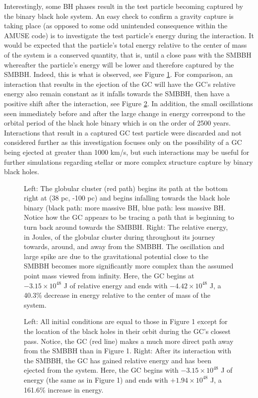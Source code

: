 \documentclass{aastex62}
\begin{document}
Interestingly, some BH phases result in the test particle becoming captured by the binary black hole system. An easy check to confirm a gravity capture is taking place (as opposed to some odd unintended consequence within the AMUSE code) is to investigate the test particle's energy during the interaction. It would be expected that the particle's total energy relative to the center of mass of the system is a conserved quantity, that is, until a close pass with the SMBBH whereafter the particle's energy will be lower and therefore captured by the SMBBH. Indeed, this is what is observed, see Figure \ref{fig3}. For comparison, an interaction that results in the ejection of the GC will have the GC's relative energy also remain constant as it infalls towards the SMBBH, then have a positive shift after the interaction, see Figure \ref{fig4}. In addition, the small oscillations seen immediately before and after the large change in energy correspond to the orbital period of the black hole binary which is on the order of 2500 years. Interactions that result in a captured GC test particle were discarded and not considered further as this investigation focuses only on the possibility of a GC being ejected at greater than 1000 km/s, but such interactions may be useful for further simulations regarding stellar or more complex structure capture by binary black holes.
\begin{figure}
\caption{Left: The globular cluster (red path) begins its path at the bottom right at (38 pc, -100 pc) and begins infalling towards the black hole binary (black path: more massive BH, blue path: less massive BH. Notice how the GC appears to be tracing a path that is beginning to turn back around towards the SMBBH. Right: The relative energy, in Joules, of the globular cluster during throughout its journey towards, around, and away from the SMBBH. The oscillation and large spike are due to the gravitational potential close to the SMBBH becomes more significantly more complex than the assumed point mass viewed from infinity. Here, the GC begins at $-3.15\times10^{48}$ J of relative energy and ends with $-4.42\times10^{48}$ J, a 40.3\% decrease in energy relative to the center of mass of the system.\label{fig3}}
\end{figure}
\begin{figure}
\caption{Left: All initial conditions are equal to those in Figure 1 except for the location of the black holes in their orbit during the GC's closest pass. Notice, the GC (red line) makes a much more direct path away from the SMBBH than in Figure 1. Right: After its interaction with the SMBBH, the GC has gained relative energy and has been ejected from the system. Here, the GC begins with $-3.15\times10^{48}$ J of energy (the same as in Figure 1) and ends with $+1.94\times10^{48}$ J, a 161.6\% increase in energy.\label{fig4}}
\end{figure}
\end{document}
